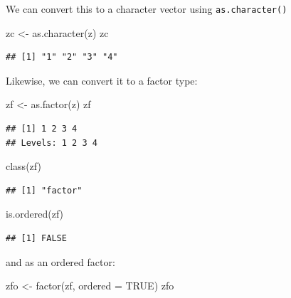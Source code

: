 \documentclass[
]{article}
\newenvironment{Shaded}{\begin{snugshade}}{\end{snugshade}}
\newcommand{\AttributeTok}[1]{\textcolor[rgb]{0.77,0.63,0.00}{#1}}
\newcommand{\ConstantTok}[1]{\textcolor[rgb]{0.00,0.00,0.00}{#1}}
\newcommand{\FunctionTok}[1]{\textcolor[rgb]{0.00,0.00,0.00}{#1}}
\newcommand{\NormalTok}[1]{#1}
\newcommand{\OtherTok}[1]{\textcolor[rgb]{0.56,0.35,0.01}{#1}}
\begin{document}
We can convert this to a character vector using \texttt{as.character()}

\begin{Shaded}
\begin{Highlighting}[]
\NormalTok{zc }\OtherTok{\textless{}{-}}  \FunctionTok{as.character}\NormalTok{(z)}
\NormalTok{zc}
\end{Highlighting}
\end{Shaded}

\begin{verbatim}
## [1] "1" "2" "3" "4"
\end{verbatim}

Likewise, we can convert it to a factor type:

\begin{Shaded}
\begin{Highlighting}[]
\NormalTok{zf }\OtherTok{\textless{}{-}} \FunctionTok{as.factor}\NormalTok{(z)}
\NormalTok{zf}
\end{Highlighting}
\end{Shaded}

\begin{verbatim}
## [1] 1 2 3 4
## Levels: 1 2 3 4
\end{verbatim}

\begin{Shaded}
\begin{Highlighting}[]
\FunctionTok{class}\NormalTok{(zf)}
\end{Highlighting}
\end{Shaded}

\begin{verbatim}
## [1] "factor"
\end{verbatim}

\begin{Shaded}
\begin{Highlighting}[]
\FunctionTok{is.ordered}\NormalTok{(zf)}
\end{Highlighting}
\end{Shaded}

\begin{verbatim}
## [1] FALSE
\end{verbatim}

and as an ordered factor:

\begin{Shaded}
\begin{Highlighting}[]
\NormalTok{zfo }\OtherTok{\textless{}{-}} \FunctionTok{factor}\NormalTok{(zf, }
              \AttributeTok{ordered =} \ConstantTok{TRUE}\NormalTok{)}
\NormalTok{zfo}
\end{Highlighting}
\end{Shaded}
\end{document}
